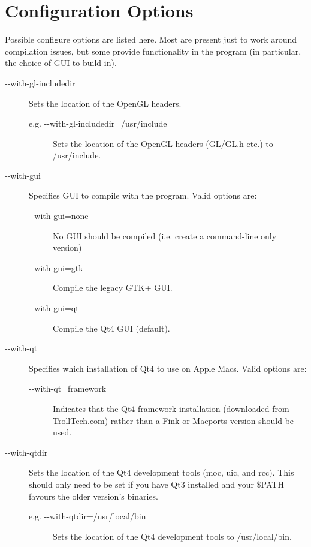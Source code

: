 \section{Configuration Options}

Possible {\sffamily configure} options are listed here. Most are present just to work around compilation issues, but some provide functionality in the program (in particular, the choice of GUI to build in).

\begin{description}

	\item[{-}{-}with-gl-includedir]
		Sets the location of the OpenGL headers.
	\begin{description}
		\item[e.g. {-}{-}with-gl-includedir=/usr/include]
			Sets the location of the OpenGL headers (GL/GL.h etc.) to /usr/include.
	\end{description}

	\item[{-}{-}with-gui] Specifies GUI to compile with the program. Valid options are:
	\begin{description}
		\item[{-}{-}with-gui=none\its]
			No GUI should be compiled (i.e. create a command-line only version)
		\item[{-}{-}with-gui=gtk\its]
			Compile the legacy GTK+ GUI.
		\item[{-}{-}with-gui=qt\its]
			Compile the Qt4 GUI (default).
	\end{description}

	\item[{-}{-}with-qt] Specifies which installation of Qt4 to use on Apple Macs. Valid options are:
	\begin{description}
		\item[{-}{-}with-qt=framework]
			Indicates that the Qt4 framework installation (downloaded from TrollTech.com) rather than a Fink or Macports version should be used.
	\end{description}

	\item[{-}{-}with-qtdir] Sets the location of the Qt4 development tools ({\sffamily moc}, {\sffamily uic}, and {\sffamily rcc}). This should only need to be set if you have Qt3 installed and your \$PATH favours the older version's binaries.
	\begin{description}
		\item[e.g. {-}{-}with-qtdir=/usr/local/bin]
			Sets the location of the Qt4 development tools to /usr/local/bin.
	\end{description}

\end{description}


